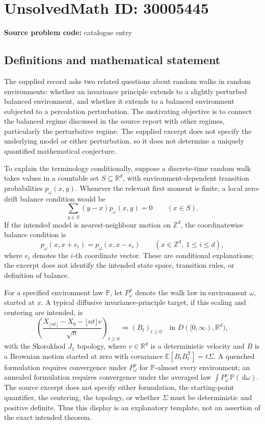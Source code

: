 \documentclass[11pt]{article}
\newcommand{\Z}{\mathbb{Z}}
\newcommand{\R}{\mathbb{R}}
\newcommand{\dd}{\,\mathrm{d}}
\begin{document}
\section*{UnsolvedMath ID: 30005445}
\textbf{Source problem code:} catalogue entry
\subsection{Definitions and mathematical statement}
The supplied record asks two related questions about random walks in random environments: whether an invariance principle extends to a slightly perturbed balanced environment, and whether it extends to a balanced environment subjected to a percolation perturbation. The motivating objective is to connect the balanced regime discussed in the source report with other regimes, particularly the perturbative regime. The supplied excerpt does not specify the underlying model or either perturbation, so it does not determine a uniquely quantified mathematical conjecture.

To explain the terminology conditionally, suppose a discrete-time random walk takes values in a countable set \(S\subseteq\R^d\), with environment-dependent transition probabilities \(p_\omega(x,y)\). Whenever the relevant first moment is finite, a local zero-drift balance condition would be
\[
\sum_{y\in S}(y-x)p_\omega(x,y)=0\qquad(x\in S).
\]
If the intended model is nearest-neighbour motion on \(\Z^d\), the coordinatewise balance condition is
\[
p_\omega(x,x+e_i)=p_\omega(x,x-e_i)
\qquad(x\in\Z^d,\ 1\leq i\leq d),
\]
where \(e_i\) denotes the \(i\)-th coordinate vector. These are conditional explanations; the excerpt does not identify the intended state space, transition rules, or definition of balance.

For a specified environment law \(\mathbb P\), let \(P_\omega^x\) denote the walk law in environment \(\omega\), started at \(x\). A typical diffusive invariance-principle target, if this scaling and centering are intended, is
\[
\left(\frac{X_{\lfloor nt\rfloor}-X_0-\lfloor nt\rfloor v}{\sqrt n}\right)_{t\geq0}
\Longrightarrow (B_t)_{t\geq0}
\quad\text{in }D([0,\infty),\R^d),
\]
with the Skorokhod \(J_1\) topology, where \(v\in\R^d\) is a deterministic velocity and \(B\) is a Brownian motion started at zero with covariance \(\mathbb E[B_tB_t^{\mathsf T}]=t\Sigma\). A quenched formulation requires convergence under \(P_\omega^x\) for \(\mathbb P\)-almost every environment; an annealed formulation requires convergence under the averaged law \(\int P_\omega^x\,\mathbb P(\dd\omega)\). The source excerpt does not specify either formulation, the starting-point quantifier, the centering, the topology, or whether \(\Sigma\) must be deterministic and positive definite. Thus this display is an explanatory template, not an assertion of the exact intended theorem.
\end{document}

